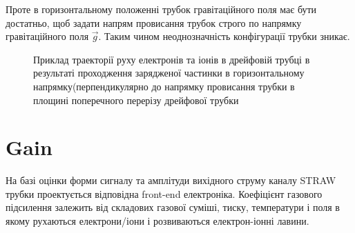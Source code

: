 \documentclass[]{article}
\begin{document}
	Проте в горизонтальному положенні трубок гравітаційного поля має бути достатньо, щоб задати напрям провисання трубок строго по напрямку гравітаційного поля $\vec{g}$. Таким чином неоднозначність конфігурації трубки зникає.
	\begin{figure}[h]
		\centering
		\qquad
		\caption{ Приклад траекторії руху електронів та іонів в дрейфовій трубці в результаті проходження зарядженої частинки в горизонтальному напрямку(перпендикулярно до напрямку провисання трубки в площині поперечного перерізу дрейфової трубки}			
	\end{figure}
	 
	\section{Gain}
	На базі оцінки форми сигналу та амплітуди вихідного струму каналу STRAW трубки проектується відповідна front-end електроніка. Коефіцієнт газового підсилення залежить від складових газової суміші, тиску, температури і поля в якому рухаються електрони/іони і розвиваються електрон-іонні лавини.
	
\end{document}

